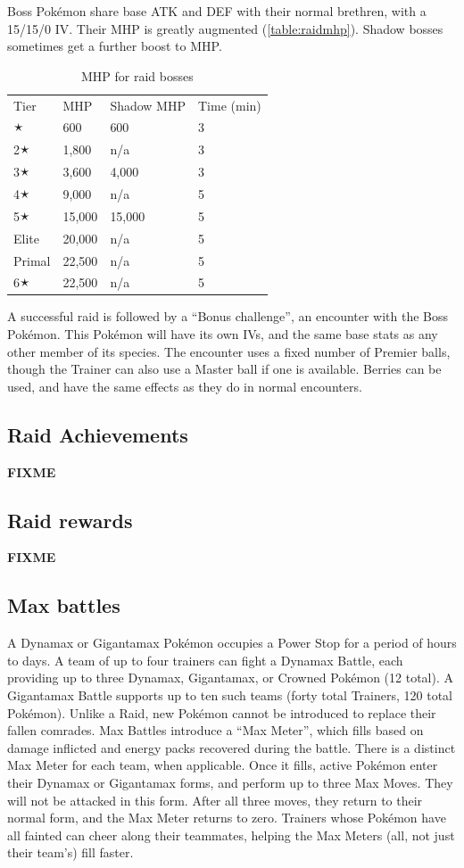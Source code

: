 Boss Pokémon share base ATK and DEF with their normal brethren, with a 15/15/0 IV\@.
Their MHP is greatly augmented (\autoref{table:raidmhp}).
Shadow bosses sometimes get a further boost to MHP\@.
\begin{table}
\centering
\begin{tabular}{llll}
  Tier & MHP & Shadow MHP & Time (min)\\
  \Midrule
  1🟉 & 600 & 600 & 3 \\
  2🟉 & 1,800 & n/a & 3\\
  3🟉 & 3,600 & 4,000 & 3\\
  4🟉 & 9,000 & n/a & 5\\
  5🟉 & 15,000 & 15,000 & 5\\
  Elite & 20,000 & n/a & 5\\
  Primal & 22,500 & n/a & 5\\
  6🟉 & 22,500 & n/a & 5\\
\end{tabular}
\caption{MHP for raid bosses}
\label{table:raidmhp}
\end{table}
A successful raid is followed by a ``Bonus challenge'', an encounter with the Boss Pokémon.
This Pokémon will have its own IVs, and the same base stats as any other member of its species.
The encounter uses a fixed number of Premier balls, though the Trainer can also
  use a Master ball if one is available.
Berries can be used, and have the same effects as they do in normal encounters.

\subsection{Raid Achievements}
\label{subsec:raidachievements}
\textbf{FIXME}

\subsection{Raid rewards}
\label{subsec:raidawards}
\textbf{FIXME}

\subsection{Max battles}
\label{sec:maxbattles}
A Dynamax or Gigantamax Pokémon occupies a Power Stop for a period of hours to days.
A team of up to four trainers can fight a Dynamax Battle, each providing up to
  three Dynamax, Gigantamax, or Crowned Pokémon (12 total).
A Gigantamax Battle supports up to ten such teams (forty total Trainers, 120 total Pokémon).
Unlike a Raid, new Pokémon cannot be introduced to replace their fallen comrades.
Max Battles introduce a ``Max Meter'', which fills based on damage inflicted and
  energy packs recovered during the battle.
There is a distinct Max Meter for each team, when applicable.
Once it fills, active Pokémon enter their Dynamax or Gigantamax forms, and perform
  up to three Max Moves.
They will not be attacked in this form.
After all three moves, they return to their normal form, and the Max Meter returns to zero.
Trainers whose Pokémon have all fainted can cheer along their teammates,
  helping the Max Meters (all, not just their team's) fill faster.

